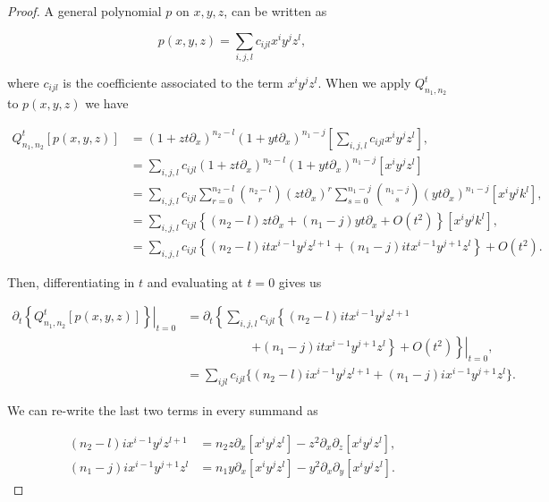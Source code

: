     \begin{proof}
        A general polynomial $p$ on $x,y,z$, can be written as 

        \begin{equation*}
            p(x,y,z) = \sum_{i,j,l} c_{ijl}x^i y^j z^l,
        \end{equation*}

        \noindent where $c_{ijl}$ is the coefficiente associated to the term $x^i y^j z^l$. When we apply $Q_{n_1,n_2}^t$ to $p(x,y,z)$ we have

        \begin{align*}
            Q_{n_1,n_2}^t [p(x,y,z)] &= (1+zt\partial_x)^{n_2-l} \left(1 + yt\partial_x\right)^{n_1 - j}\left[\sum_{i,j,l}c_{ijl}x^i y^j z^l\right],\\
            &= \sum_{i,j,l}c_{ijl}(1+zt\partial_x)^{n_2-l} \left(1 + yt\partial_x\right)^{n_1 - j}\left[x^i y^j z^l\right]\\
            &= \sum_{i,j,l}c_{ijl}\sum_{r=0}^{n_2-l}\binom{n_2-l}{r}(zt\partial_x)^r\sum_{s=0}^{n_1-j}\binom{n_1-j}{s}(yt\partial_x)^{n_1-j}[x^iy^jk^l],\\
            &= \sum_{i,j,l} c_{ijl}\left\{ (n_2-l)zt\partial_x + (n_1-j)yt\partial_x + O(t^2) \right\}[x^iy^jk^l],\\ 
            &= \sum_{i,j,l} c_{ijl}\left\{ (n_2-l)itx^{i-1}y^j z^{l+1} + (n_1-j)itx^{i-1}y^{j+1}z^l \right\} + O(t^2).
        \end{align*}

        Then, differentiating in $t$ and evaluating at $t=0$ gives us

        \begin{align*}
            \left.\partial_t \left\{ Q_{n_1,n_2}^t [p(x,y,z)] \right\}\right|_{t=0} &= \left.\partial_t \left\{ \sum_{i,j,l} c_{ijl}\left\{ (n_2-l)itx^{i-1}y^j z^{l+1} \right.\right.\right.\\
            &\left.\left.\phantom{espac\sum_{i,j,l}}\left.+ (n_1-j)itx^{i-1}y^{j+1}z^l \right\} + O(t^2) \right\}\right|_{t=0}, \\
            &= \sum_{ijl} c_{ijl}\{ (n_2-l)ix^{i-1}y^jz^{l+1} + (n_1-j)ix^{i-1}y^{j+1}z^l\}.
        \end{align*}

        We can re-write the last two terms in every summand as

        \begin{align*}
            (n_2-l)ix^{i-1}y^jz^{l+1} &= n_2z\partial_x[x^iy^jz^l] - z^2\partial_x\partial_z[x^iy^jz^l],\\
            (n_1-j)ix^{i-1}y^{j+1}z^{l} &= n_1y\partial_x[x^iy^jz^l] - y^2\partial_x\partial_y[x^iy^jz^l].
        \end{align*}


\end{proof}
